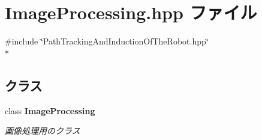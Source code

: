 \section{Image\-Processing.\-hpp ファイル}
\label{_image_processing_8hpp}
{\ttfamily \#include \char`\"{}Path\-Tracking\-And\-Induction\-Of\-The\-Robot.\-hpp\char`\"{}}\\*
\subsection*{クラス}
\begin{DoxyCompactItemize}
\item 
class {\bf Image\-Processing}
\begin{DoxyCompactList}\small\item\em 画像処理用のクラス \end{DoxyCompactList}\end{DoxyCompactItemize}
